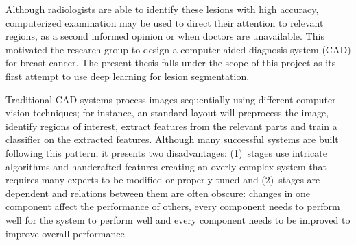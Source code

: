Although radiologists are able to identify these lesions with high accuracy, computerized examination may be used to direct their attention to relevant regions, as a second informed opinion or when doctors are unavailable. 
This motivated the research group to design a computer-aided diagnosis system (CAD) for breast cancer. The present thesis falls under the scope of this project as its first attempt to use deep learning for lesion segmentation.

Traditional CAD systems process images sequentially using different computer vision techniques; for instance, an standard layout will preprocess the image, identify regions of interest, extract features from the relevant parts and train a classifier on the extracted features.
Although many successful systems are built following this pattern, it presents two disadvantages: (1)~stages use intricate algorithms and handcrafted features creating an overly complex system that requires many experts to be modified or properly tuned and (2)~stages are dependent and relations between them are often obscure: changes in one component affect the performance of others, every component needs to perform well for the system to perform well and every component needs to be improved to improve overall performance.

